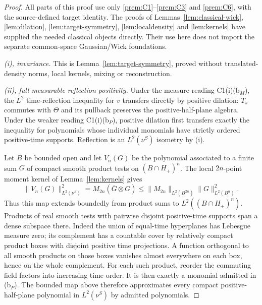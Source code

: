 \documentclass[11pt]{article}
\theoremstyle{plain}
\theoremstyle{definition}
\theoremstyle{remark}
\newcommand{\conj}[1]{\overline{#1}}
\begin{document}
\begin{proof}
All parts of this proof use only \ref{prem:C1}--\ref{prem:C3} and
\ref{prem:C6}, with the source-defined target identity. The proofs of
Lemmas~\ref{lem:classical-wick}, \ref{lem:dilation},
\ref{lem:target-symmetry}, \ref{lem:localdensity} and \ref{lem:kernels}
have supplied the needed classical objects directly. Their use here does
not import the separate common-space Gaussian/Wick foundations.

\label{proof:CT-i}
\emph{(i), invariance.} This is Lemma~\ref{lem:target-symmetry}, proved
without translated-density norms, local kernels, mixing or reconstruction.

\label{proof:CT-ii}
\emph{(ii), full measurable reflection positivity.}
Under the measure reading C1(i)(b$_M$), the $L^2$ time-reflection inequality
for $v$ transfers directly by positive dilation: $T_s$ commutes with
$\Theta$ and its pullback preserves the positive-half-plane algebra.
Under the weaker reading C1(i)(b$_P$), positive dilation first transfers
exactly the inequality for polynomials whose individual monomials have
strictly ordered positive-time supports. Reflection is an $L^2(\nu^S)$
isometry by (i).

Let $B$ be bounded open and let $V_n(G)$ be the polynomial associated to
a finite sum $G$ of compact smooth product tests on $(B\cap H_+)^n$.
The local $2n$-point moment kernel of Lemma~\ref{lem:kernels} gives
\begin{equation}\label{eq:RP-polynomial-map}
 \|V_n(G)\|_{L^2(\nu^S)}^2
 =M_{2n}(\conj G\otimes G)
 \le\|M_{2n}\|_{L^2(B^{2n})}\|G\|_{L^2(B^n)}^2.
\end{equation}
Thus this map extends boundedly from product sums to $L^2((B\cap H_+)^n)$.
Products of real smooth tests with pairwise disjoint positive-time supports
span a dense subspace there. Indeed the union of equal-time hyperplanes
has Lebesgue measure zero; its complement has a countable cover by
relatively compact product boxes with disjoint positive time projections.
A function orthogonal to all smooth products on those boxes vanishes
almost everywhere on each box, hence on the whole complement. For each
such product, reorder the commuting field factors into increasing time
order. It is then exactly a monomial admitted in (b$_P$).
The bounded map above therefore approximates every compact
positive-half-plane polynomial in $L^2(\nu^S)$ by admitted polynomials.


\end{proof}
\end{document}
